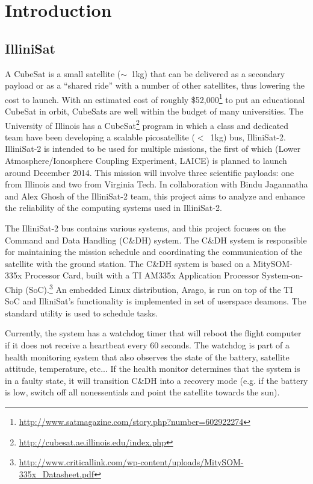 \section{Introduction}
\subsection{IlliniSat}
A CubeSat is a small satellite ($\sim$~1kg) that can be delivered as a secondary
payload or as a ``shared ride'' with a number of other satellites, thus lowering
the cost to launch\cite{toorian2008cubesat}.  With an estimated cost of roughly
\$52,000\footnote{\url{http://www.satmagazine.com/story.php?number=602922274}}
to put an educational CubeSat in orbit, CubeSats are well within the budget of
many universities.  The University of Illinois has a
CubeSat\footnote{\url{http://cubesat.ae.illinois.edu/index.php}} program in
which a class and dedicated team have been developing a scalable picosatellite
($<$~1kg) bus, IlliniSat-2.  IlliniSat-2 is intended to be used for multiple
missions, the first of which (Lower Atmosphere/Ionosphere Coupling Experiment,
LAICE) is planned to launch around December 2014.  This mission will involve
three scientific payloads: one from Illinois and two from Virginia Tech.  In
collaboration with Bindu Jagannatha and Alex Ghosh of the IlliniSat-2 team, this
project aims to analyze and enhance the reliability of the computing systems
used in IlliniSat-2.

The IlliniSat-2 bus contains various systems, and this project focuses on the
Command and Data Handling (C\&DH) system.  The C\&DH system is responsible
for maintaining the mission schedule and coordinating the communication of the
satellite with the ground station.  The C\&DH system is based on a MitySOM-335x
Processor Card, built with a TI AM335x Application Processor System-on-Chip
(SoC).\footnote{\url{http://www.criticallink.com/wp-content/uploads/MitySOM-335x_Datasheet.pdf}}
An embedded Linux distribution, Arago, is run on top of the TI SoC and
IlliniSat's functionality is implemented in set of userspace deamons. The
standard  utility is used to schedule tasks.

Currently, the system has a watchdog timer that will reboot the flight computer
if it does not receive a heartbeat every 60 seconds.  The watchdog is part of a
health monitoring system that also observes the state of the battery, satellite 
attitude, temperature, etc...  If the health monitor determines that the system
is in a faulty state, it will transition C\&DH into a recovery mode (e.g. if the
battery is low, switch off all nonessentials and point the satellite towards the
sun).

